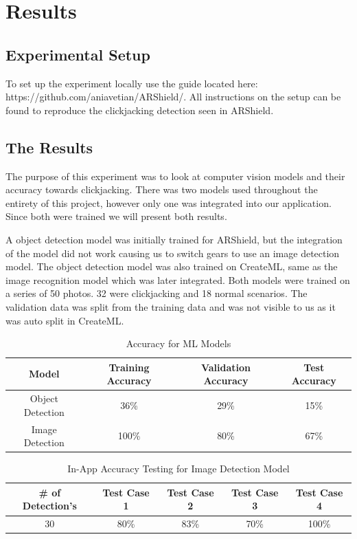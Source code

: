 \documentclass[conference]{IEEEtran}
\begin{document}
\section{Results}

\subsection{Experimental Setup}

To set up the experiment locally use the guide located here: https://github.com/aniavetian/ARShield/. All instructions on the setup can be found to reproduce the clickjacking detection seen in ARShield. 

\subsection{The Results}

The purpose of this experiment was to look at computer vision models and their accuracy towards clickjacking. There was two models used throughout the entirety of this project, however only one was integrated into our application. Since both were trained we will present both results. 

A object detection model was initially trained for ARShield, but the integration of the model did not work causing us to switch gears to use an image detection model. The object detection model was also trained on CreateML, same as the image recognition model which was later integrated. Both models were trained on a series of 50 photos. 32 were clickjacking and 18 normal scenarios. The validation data was split from the training data and was not visible to us as it was auto split in CreateML.

\begin{table}[htbp]
    \centering
    \begin{tabular}{|c|c|c|c|}
        \hline
        Model & Training Accuracy & Validation Accuracy & Test Accuracy\\
        \hline
        Object Detection & 36\% & 29\% & 15\% \\
        Image Detection & 100\% & 80\% & 67\% \\
        \hline
    \end{tabular}
    \caption{Accuracy for ML Models}
    \label{tab:simple-table}
\end{table}

\begin{table}[htbp]
    \centering
    \begin{tabular}{|c|c|c|c|c|}
        \hline
        \# of Detection's & Test Case 1 & Test Case 2 & Test Case 3 & Test Case 4 \\
        \hline
        30 & 80\% & 83\% & 70\% & 100\% \\
        \hline
    \end{tabular}
    \caption{In-App Accuracy Testing for Image Detection Model}
    \label{tab:simple-table}
\end{table}
\end{document}
